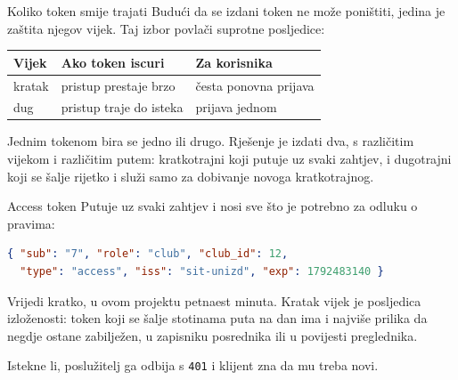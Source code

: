 \begin{frame}{Koliko token smije trajati}
Budući da se izdani token ne može poništiti, jedina je zaštita njegov vijek. Taj izbor povlači suprotne posljedice:

\vspace{0.6em}
\begin{center}
{\small
\setlength{\tabcolsep}{8pt}
\renewcommand{\arraystretch}{1.4}
\begin{tabular}{@{}lll@{}}
  \toprule
  \textbf{Vijek} & \textbf{Ako token iscuri} & \textbf{Za korisnika} \\
  \midrule
  kratak & pristup prestaje brzo        & česta ponovna prijava \\
  dug    & pristup traje do isteka      & prijava jednom \\
  \bottomrule
\end{tabular}
}
\end{center}

\pause
\vspace{0.6em}
Jednim tokenom bira se jedno ili drugo. Rješenje je izdati dva, s različitim vijekom i različitim putem: kratkotrajni koji putuje uz svaki zahtjev, i dugotrajni koji se šalje rijetko i služi samo za dobivanje novoga kratkotrajnog.
\end{frame}

\begin{frame}[fragile]{Access token}
Putuje uz svaki zahtjev i nosi sve što je potrebno za odluku o pravima:

\begin{lstlisting}[language=json]
{ "sub": "7", "role": "club", "club_id": 12,
  "type": "access", "iss": "sit-unizd", "exp": 1792483140 }
\end{lstlisting}

\vspace{0.4em}
Vrijedi kratko, u ovom projektu petnaest minuta. Kratak vijek je posljedica izloženosti: token koji se šalje stotinama puta na dan ima i najviše prilika da negdje ostane zabilježen, u zapisniku posrednika ili u povijesti preglednika.

\vspace{1.1em}
Istekne li, poslužitelj ga odbija s \texttt{401} i klijent zna da mu treba novi.
\end{frame}

